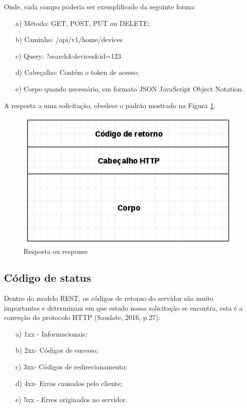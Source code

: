 Onde, cada campo poderia ser exemplificado da seguinte forma:

\begin{itemize}
    \item [a)] Método: GET, POST, PUT ou DELETE;
    \item [b)] Caminho: /api/v1/home/devices
    \item [c)] Query: ?search\&devices\&id=123
    \item [d)] Cabeçalho: Contém o token de acesso;
    \item [e)] Corpo quando necessário, em formato JSON JavaScript Object Notation.
\end{itemize}

A resposta a uma solicitação, obedece o padrão mostrado na Figura \ref{response}.

\begin{figure}[H]
\caption{\label{response} Resposta ou response}
\includegraphics[scale=0.5]{img/api-response.png}
\end{figure}

\subsection{Código de status}
Dentro do modelo REST, os códigos de retorno do servidor são muito importantes e determinam em que estado nossa solicitação se encontra, esta é a conveção do protocolo HTTP (Saudate, 2016, p.27):

\begin{itemize}
    \item [a)] 1xx - Informacionais;
    \item [b)] 2xx- Códigos de sucesso;
    \item [c)] 3xx- Códigos de redirecionamento;
    \item [d)] 4xx- Erros causados pelo cliente;
    \item [e)] 5xx - Erros originados no servidor.
\end{itemize}

